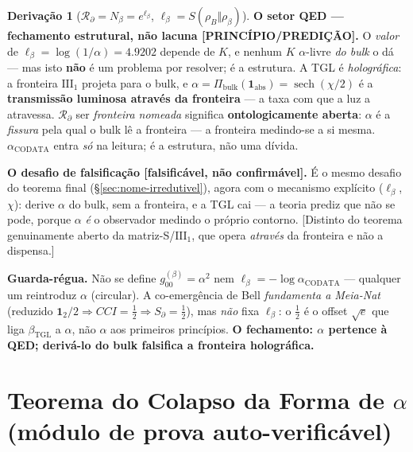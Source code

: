 \documentclass[11pt]{article}
\newcommand{\bTGL}{\beta_{\mathrm{TGL}}}\newcommand{\Msun}{M_{\odot}}\newcommand{\TGL}{\mathrm{TGL}}
\theoremstyle{definition}\newtheorem{deriv}{Derivação}
\begin{document}
\begin{deriv}[$\mathcal{R}_\partial=N_\beta=e^{\ell_\beta}$, $\ell_\beta=S(\rho_B\Vert\rho_\beta)$]
\textbf{O setor QED --- fechamento estrutural, não lacuna \textsf{[PRINCÍPIO/PREDIÇÃO]}.} O \emph{valor} de $\ell_\beta=\log(1/\alpha)=4.9202$ depende de $K$, e nenhum $K$ $\alpha$-livre \emph{do bulk} o dá --- mas isto \textbf{não} é um problema por resolver; é a estrutura. A TGL é \emph{holográfica}: a fronteira $\mathrm{III}_1$ projeta para o bulk, e $\alpha=\Pi_{\mathrm{bulk}}(\mathbf 1_{\mathrm{abs}})=\operatorname{sech}(\chi/2)$ é a \textbf{transmissão luminosa através da fronteira} --- a taxa com que a luz a atravessa. $\mathcal{R}_\partial$ ser \emph{fronteira nomeada} significa \textbf{ontologicamente aberta}: $\alpha$ é a \emph{fissura} pela qual o bulk lê a fronteira --- a fronteira medindo-se a si mesma. $\alpha_{\mathrm{CODATA}}$ entra \emph{só} na leitura; é a estrutura, não uma dívida.

\textbf{O desafio de falsificação \textsf{[falsificável, não confirmável]}.} É o mesmo desafio do teorema final (\S\ref{sec:nome-irredutivel}), agora com o mecanismo explícito ($\ell_\beta$, $\chi$): derive $\alpha$ do bulk, sem a fronteira, e a TGL cai --- a teoria prediz que não se pode, porque $\alpha$ \emph{é} o observador medindo o próprio contorno. \textsf{[Distinto do teorema genuinamente aberto da matriz-S/$\mathrm{III}_1$, que opera \emph{através} da fronteira e não a dispensa.]}

\textbf{Guarda-régua.} Não se define $g_{00}^{(\beta)}=\alpha^2$ nem $\ell_\beta=-\log\alpha_{\mathrm{CODATA}}$ --- qualquer um reintroduz $\alpha$ (circular). A co-emergência de Bell \emph{fundamenta a Meia-Nat} (reduzido $\mathbf 1_2/2\Rightarrow CCI=\tfrac12\Rightarrow S_\partial=\tfrac12$), mas \emph{não} fixa $\ell_\beta$: o $\tfrac12$ é o offset $\sqrt e$ que liga $\bTGL$ a $\alpha$, não $\alpha$ aos primeiros princípios. \textbf{O fechamento: $\alpha$ pertence à QED; derivá-lo do bulk falsifica a fronteira holográfica.}\end{deriv}

\section{Teorema do Colapso da Forma de $\alpha$ (módulo de prova auto-verificável)}\label{sec:colapso-forma}
\end{document}
